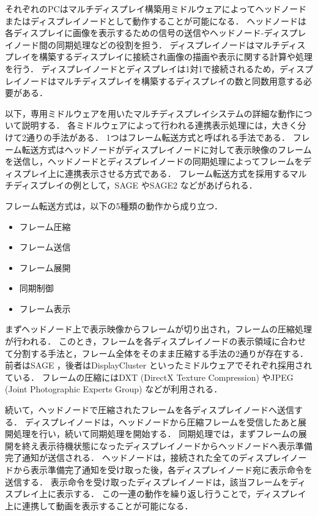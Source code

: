 それぞれのPCはマルチディスプレイ構築用ミドルウェアによってヘッドノードまたはディスプレイノードとして動作することが可能になる．
ヘッドノードは各ディスプレイに画像を表示するための信号の送信やヘッドノード-ディスプレイノード間の同期処理などの役割を担う．
ディスプレイノードはマルチディスプレイを構築するディスプレイに接続され画像の描画や表示に関する計算や処理を行う．
ディスプレイノードとディスプレイは1対1で接続されるため，ディスプレイノードはマルチディスプレイを構築するディスプレイの数と同数用意する必要がある．

以下，専用ミドルウェアを用いたマルチディスプレイシステムの詳細な動作について説明する．
各ミドルウェアによって行われる連携表示処理には，大きく分けて2通りの手法がある．
1つはフレーム転送方式と呼ばれる手法である．
フレーム転送方式はヘッドノードがディスプレイノードに対して表示映像のフレームを送信し，ヘッドノードとディスプレイノードの同期処理によってフレームをディスプレイ上に連携表示させる方式である．
フレーム転送方式を採用するマルチディスプレイの例として，SAGE \cite{sage}やSAGE2 \cite{sage2}などがあげられる．

フレーム転送方式は，以下の5種類の動作から成り立つ．

\begin{itemize}
    \item フレーム圧縮
    \item フレーム送信
    \item フレーム展開
    \item 同期制御
    \item フレーム表示
  \end{itemize}

まずヘッドノード上で表示映像からフレームが切り出され，フレームの圧縮処理が行われる．
このとき，フレームを各ディスプレイノードの表示領域に合わせて分割する手法と，フレーム全体をそのまま圧縮する手法の2通りが存在する．
前者はSAGE \cite{sage}，後者はDisplayCluster \cite{displaycluster}といったミドルウェアでそれぞれ採用されている．
フレームの圧縮にはDXT (DirectX Texture Compression) \cite{dxt}やJPEG (Joint Photographic Experts Group) \cite{jpeg}などが利用される．

続いて，ヘッドノードで圧縮されたフレームを各ディスプレイノードへ送信する．
ディスプレイノードは，ヘッドノードから圧縮フレームを受信したあと展開処理を行い，続いて同期処理を開始する．
同期処理では，まずフレームの展開を終え表示待機状態になったディスプレイノードからヘッドノードへ表示準備完了通知が送信される．
ヘッドノードは，接続された全てのディスプレイノードから表示準備完了通知を受け取った後，各ディスプレイノード宛に表示命令を送信する．
表示命令を受け取ったディスプレイノードは，該当フレームをディスプレイ上に表示する．
この一連の動作を繰り返し行うことで，ディスプレイ上に連携して動画を表示することが可能になる．

